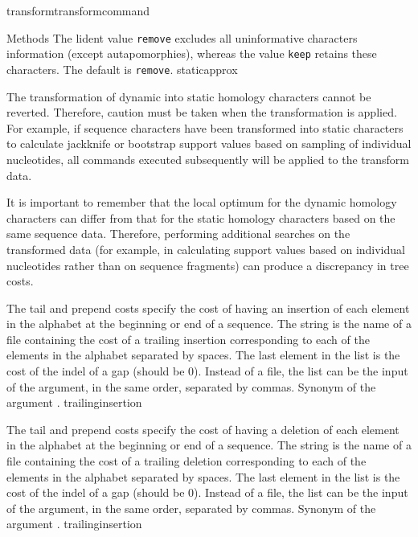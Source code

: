 \begin{command}{transform}{transformcommand}
\begin{arguments}
\begin{argumentgroup}{Methods}
{            The lident value \texttt{remove} excludes all uninformative characters
            information (except autapomorphies), whereas the value \texttt{keep}
            retains these characters. The default is \texttt{remove}.}
            {staticapprox}
            
            \begin{statement}
  	  The transformation of dynamic into static homology characters cannot be reverted.
	  Therefore, caution must be taken when the transformation is applied. For example,
	  if sequence characters  have been transformed into static characters to calculate
	  jackknife or bootstrap support values based on sampling of individual nucleotides,
	  all commands executed subsequently will be applied to the transform data.
	\end{statement}
	
	\begin{statement}
  	  It is important to remember that the local optimum for the dynamic homology
	  characters can differ from that for the static homology characters based on the
	  same sequence data. Therefore, performing additional searches on the transformed
	  data (for example, in calculating support values based on individual nucleotides
	  rather than on sequence fragments) can produce a discrepancy in tree costs.
	\end{statement}

            {The tail and prepend costs specify the cost of having an insertion of
            each element in the alphabet at the beginning or end
            of a sequence. The string is the name of a file containing the cost of
            a trailing insertion corresponding to each of the elements
            in the alphabet separated by spaces. The last element in the list is the
            cost of the indel of a gap (should be 0). Instead of a file, the list can
            be the input of the argument, in the same order, separated by commas.
            Synonym of the argument .} 
            {trailinginsertion}

            {The tail and prepend costs specify the cost of having a deletion
            of each element in the alphabet at the beginning or end
            of a sequence. The string is the name of a file containing the cost of
            a trailing deletion corresponding to each of the elements
            in the alphabet separated by spaces. The last element in the list is the
            cost of the indel of a gap (should be 0). Instead of a file, the list can
            be the input of the argument, in the same order, separated by commas.
            Synonym of the argument .} 
            {trailinginsertion}


\end{argumentgroup}
\end{arguments}
\end{command}
